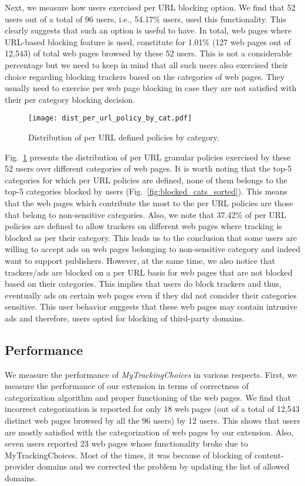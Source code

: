 \documentclass[conference]{IEEEtran}
\begin{document}
Next, we measure how users exercised per URL blocking option.
We find that 52 users out of a total of 96 users, i.e., 54.17\% users, used this functionality.
This clearly suggests that such an option is useful to have.
In total, web pages where URL-based blocking feature is used, constitute for 1.01\% (127 web pages out of 12,543) of total web pages browsed by these 52 users.
This is not a considerable percentage but we need to keep in mind that all such users also exercised their choice regarding blocking trackers based on the categories of web pages.
They usually need to exercise per web page blocking in case they are not satisfied with their per category blocking decision.


\begin{figure}[t]
\centering
\texttt{[image: dist\_per\_url\_policy\_by\_cat.pdf]}
\caption{Distribution of per URL defined policies by category.}
\label{fig:dist_per_url_policy_by_cat}
\end{figure}
Fig.~\ref{fig:dist_per_url_policy_by_cat} presents the distribution of per URL granular policies exercised by these 52 users over different categories of web pages.
It is worth noting that the top-5 categories for which per URL policies are defined, none of them belongs to the top-5 categories blocked by users (Fig.~\ref{fig:blocked_cats_sorted}).
This means that the web pages which contribute the most to the per URL policies are those that belong to non-sensitive categories.
Also, we note that 37.42\% of per URL policies are defined to allow trackers on different web pages where tracking is blocked as per their category.
This leads us to the conclusion that some users are willing to accept ads on web pages belonging to non-sensitive category and indeed want to support publishers.
However, at the same time, we also notice that trackers/ads are blocked on a per URL basis for web pages that are not blocked based on their categories. 
This implies that users do block trackers and thus, eventually ads on certain web pages even if they did not consider their categories sensitive.
This user behavior suggests that these web pages may contain intrusive ads and therefore, users opted for blocking of third-party domains.






\subsection{Performance}
\label{subsec:performance}
We measure the performance of \emph{MyTrackingChoices} in various respects. 
First, we measure the performance of our extension in terms of correctness of categorization algorithm and proper functioning of the web pages.
We find that incorrect categorization is reported for only 18 web pages (out of a total of 12,543 distinct web pages browsed by all the 96 users) by 12 users.
This shows that users are mostly satisfied with the categorization of web pages by our extension.
Also, seven users reported 23 web pages whose functionality broke due to MyTrackingChoices.
Most of the times, it was because of blocking of content-provider domains and we corrected the problem by updating the list of allowed domains.
\end{document}
